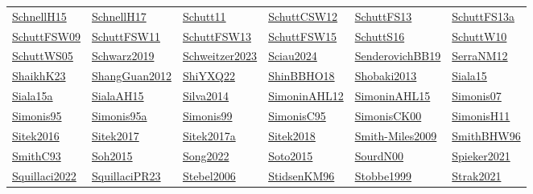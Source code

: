 \begin{longtable}{*{6}{l}}
\hyperref[detail:SchnellH15]{SchnellH15} & \hyperref[detail:SchnellH17]{SchnellH17} & \hyperref[detail:Schutt11]{Schutt11} & \hyperref[detail:SchuttCSW12]{SchuttCSW12} & \hyperref[detail:SchuttFS13]{SchuttFS13} & \hyperref[detail:SchuttFS13a]{SchuttFS13a}\\ 
\hyperref[detail:SchuttFSW09]{SchuttFSW09} & \hyperref[detail:SchuttFSW11]{SchuttFSW11} & \hyperref[detail:SchuttFSW13]{SchuttFSW13} & \hyperref[detail:SchuttFSW15]{SchuttFSW15} & \hyperref[detail:SchuttS16]{SchuttS16} & \hyperref[detail:SchuttW10]{SchuttW10}\\ 
\hyperref[detail:SchuttWS05]{SchuttWS05} & \hyperref[detail:Schwarz2019]{Schwarz2019} & \hyperref[detail:Schweitzer2023]{Schweitzer2023} & \hyperref[detail:Sciau2024]{Sciau2024} & \hyperref[detail:SenderovichBB19]{SenderovichBB19} & \hyperref[detail:SerraNM12]{SerraNM12}\\ 
\hyperref[detail:ShaikhK23]{ShaikhK23} & \hyperref[detail:ShangGuan2012]{ShangGuan2012} & \hyperref[detail:ShiYXQ22]{ShiYXQ22} & \hyperref[detail:ShinBBHO18]{ShinBBHO18} & \hyperref[detail:Shobaki2013]{Shobaki2013} & \hyperref[detail:Siala15]{Siala15}\\ 
\hyperref[detail:Siala15a]{Siala15a} & \hyperref[detail:SialaAH15]{SialaAH15} & \hyperref[detail:Silva2014]{Silva2014} & \hyperref[detail:SimoninAHL12]{SimoninAHL12} & \hyperref[detail:SimoninAHL15]{SimoninAHL15} & \hyperref[detail:Simonis07]{Simonis07}\\ 
\hyperref[detail:Simonis95]{Simonis95} & \hyperref[detail:Simonis95a]{Simonis95a} & \hyperref[detail:Simonis99]{Simonis99} & \hyperref[detail:SimonisC95]{SimonisC95} & \hyperref[detail:SimonisCK00]{SimonisCK00} & \hyperref[detail:SimonisH11]{SimonisH11}\\ 
\hyperref[detail:Sitek2016]{Sitek2016} & \hyperref[detail:Sitek2017]{Sitek2017} & \hyperref[detail:Sitek2017a]{Sitek2017a} & \hyperref[detail:Sitek2018]{Sitek2018} & \hyperref[detail:Smith-Miles2009]{Smith-Miles2009} & \hyperref[detail:SmithBHW96]{SmithBHW96}\\ 
\hyperref[detail:SmithC93]{SmithC93} & \hyperref[detail:Soh2015]{Soh2015} & \hyperref[detail:Song2022]{Song2022} & \hyperref[detail:Soto2015]{Soto2015} & \hyperref[detail:SourdN00]{SourdN00} & \hyperref[detail:Spieker2021]{Spieker2021}\\ 
\hyperref[detail:Squillaci2022]{Squillaci2022} & \hyperref[detail:SquillaciPR23]{SquillaciPR23} & \hyperref[detail:Stebel2006]{Stebel2006} & \hyperref[detail:StidsenKM96]{StidsenKM96} & \hyperref[detail:Stobbe1999]{Stobbe1999} & \hyperref[detail:Strak2021]{Strak2021}\\ 

\end{longtable}

